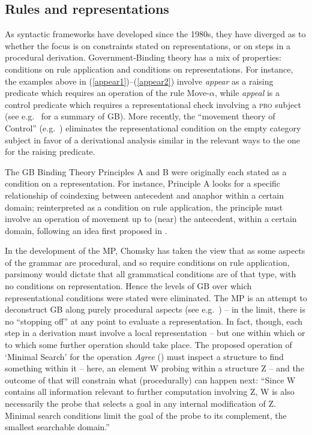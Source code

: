 \documentclass[output=paper,hidelinks]{langscibook}
\begin{document}
\subsection{Rules and representations}

As syntactic frameworks have developed since the 1980s, they have
diverged as to whether the focus is on constraints stated on
representations, or on steps in a procedural
derivation. Government-Binding theory has a mix of properties:
conditions on rule application and conditions on representations. For
instance, the examples above in (\ref{appear1})--(\ref{appear2})
involve \textit{appear} as a raising predicate which requires an
operation of the rule Move-$\alpha$, while \textit{appeal} is a control
predicate which requires a representational check involving a
\textsc{pro} subject (see e.g.~\citealp{haegeman94} for a summary of
GB). More recently, the ``movement theory of Control''
(e.g.~\citealp{hornpoli10}) eliminates the representational condition
on the empty category subject in favor of a derivational analysis
similar in the relevant ways to the one for the raising predicate.

The GB Binding Theory Principles A and B were originally each stated
as a condition on a representation. For instance, Principle A looks
for a specific relationship of coindexing between antecedent and
anaphor within a certain domain; reinterpreted as a condition on rule
application, the principle must involve an operation of movement up to
(near) the antecedent, within a certain domain, following an idea
first proposed in \citet{lebeaux83}.

In the development of the MP, Chomsky has taken
the view that as some aspects of the grammar are procedural, and so
require conditions on rule application, parsimony would dictate that
all grammatical conditions are of that type, with no conditions on
representation. Hence the levels of GB over which representational
conditions were stated were eliminated. The MP is an
attempt to deconstruct GB along purely procedural aspects (see
e.g.~\citealp[54]{hornstein18}) -- in the limit, there is no
``stopping off'' at any point to evaluate a representation. In fact,
though, each step in a derivation must involve a local representation
-- but one within which or to which some further operation should take
place. The proposed operation of `Minimal Search' for the operation
{\it Agree\/} (\citealp[9]{chomsky07}) must inspect a structure to
find something within it -- here, an element W probing within a
structure Z -- and the outcome of that will constrain what
(procedurally) can happen next: ``Since W contains all information
relevant to further computation involving Z, W is also necessarily the
probe that selects a goal in any internal modification of Z. Minimal
search conditions limit the goal of the probe to its complement, the
smallest searchable domain.''
\end{document}
